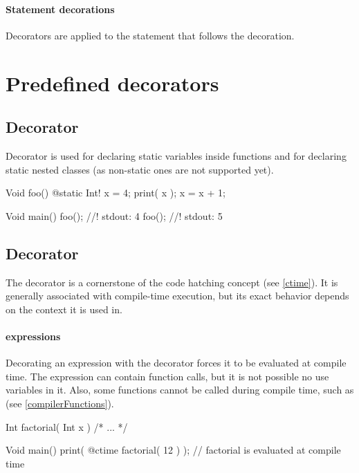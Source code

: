 \paragraph{Statement decorations} Decorators are applied to the statement that follows the decoration.

\section{Predefined decorators}

\subsection{Decorator } \label{decorator:static}
Decorator  is used for declaring static variables inside functions and for declaring static nested classes (as non-static ones are not supported yet). \nopagebreak

\begin{code}
Void foo() {
	@static Int! x = 4;
	print( x );
	x = x + 1;
}

Void main() {
	foo(); //! stdout: 4
	foo(); //! stdout: 5
}
\end{code}

\subsection{Decorator \ctime} \label{decorator:ctime}
The \ctime decorator is a cornerstone of the code hatching concept (see \autoref{ctime}). It is generally associated with compile-time execution, but its exact behavior depends on the context it is used in.

\paragraph{\ctime expressions}
Decorating an expression with the \ctime decorator forces it to be evaluated at compile time. The expression can contain function calls, but it is not possible no use \nonctime variables in it. Also, some functions cannot be called during compile time, such as  (see \autoref{compilerFunctions}).

\begin{code}
Int factorial( Int x ) { /* ... */ }
	
Void main() {
	print( @ctime factorial( 12 ) ); // factorial is evaluated at compile time
}
\end{code}

